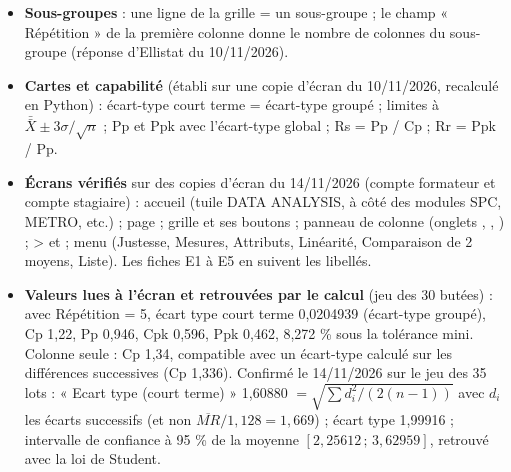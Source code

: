 \documentclass[10pt,a4paper]{article}
\begin{document}
\begin{itemize}
\item \textbf{Sous-groupes} : une ligne de la grille = un sous-groupe ; le champ « Répétition » de la première colonne donne le nombre de colonnes du sous-groupe (réponse d'Ellistat du 10/11/2026).
\item \textbf{Cartes et capabilité} (établi sur une copie d'écran du 10/11/2026, recalculé en Python) : écart-type court terme = écart-type groupé ; limites à $\bar{\bar X} \pm 3\sigma/\sqrt n$ ; Pp et Ppk avec l'écart-type global ; Rs = Pp / Cp ; Rr = Ppk / Pp.
\item \textbf{Écrans vérifiés} sur des copies d'écran du 14/11/2026 (compte formateur et compte stagiaire) : accueil (tuile DATA ANALYSIS, à côté des modules SPC, METRO, etc.) ; page  ; grille et ses boutons ; panneau de colonne (onglets , , ) ;  >  et  ; menu  (Justesse, Mesures, Attributs, Linéarité, Comparaison de 2 moyens, Liste). Les fiches E1 à E5 en suivent les libellés.
\item \textbf{Valeurs lues à l'écran et retrouvées par le calcul} (jeu des 30 butées) : avec Répétition = 5, écart type court terme 0,0204939 (écart-type groupé), Cp 1,22, Pp 0,946, Cpk 0,596, Ppk 0,462, 8,272 \% sous la tolérance mini. Colonne seule : Cp 1,34, compatible avec un écart-type calculé sur les différences successives (Cp 1,336). Confirmé le 14/11/2026 sur le jeu des 35 lots : « Ecart type (court terme) » 1,60880 $= \sqrt{\sum d_i^2/(2(n-1))}$ avec $d_i$ les écarts successifs (et non $\overline{MR}/1{,}128 = 1{,}669$) ; écart type 1,99916 ; intervalle de confiance à 95 \% de la moyenne $[2{,}25612\,;\,3{,}62959]$, retrouvé avec la loi de Student.

\end{itemize}
\end{document}
